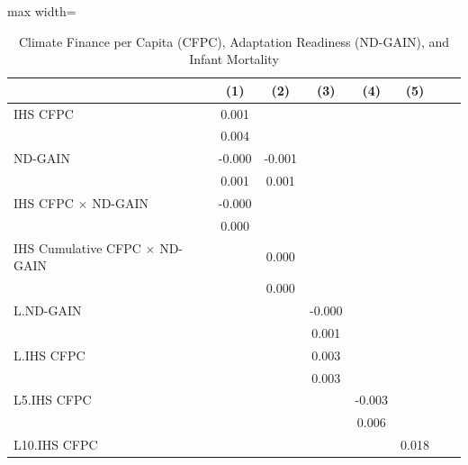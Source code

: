 \begin{table}[htbp]\centering \caption{Climate Finance per Capita (CFPC), Adaptation Readiness (ND-GAIN), and Infant Mortality} \begin{adjustbox}{max width=\textwidth} \begin{tabular}{l*{7}{c}} \toprule
                    &\multicolumn{1}{c}{(1)}   &\multicolumn{1}{c}{(2)}   &\multicolumn{1}{c}{(3)}   &\multicolumn{1}{c}{(4)}   &\multicolumn{1}{c}{(5)}   \\
\midrule
IHS CFPC            &       0.001   &               &               &               &               \\
                    &       0.004   &               &               &               &               \\
ND-GAIN             &      -0.000   &      -0.001   &               &               &               \\
                    &       0.001   &       0.001   &               &               &               \\
IHS CFPC $\times$ ND-GAIN&      -0.000   &               &               &               &               \\
                    &       0.000   &               &               &               &               \\
IHS Cumulative CFPC $\times$ ND-GAIN&               &       0.000   &               &               &               \\
                    &               &       0.000   &               &               &               \\
L.ND-GAIN           &               &               &      -0.000   &               &               \\
                    &               &               &       0.001   &               &               \\
L.IHS CFPC          &               &               &       0.003   &               &               \\
                    &               &               &       0.003   &               &               \\
L5.IHS CFPC         &               &               &               &      -0.003   &               \\
                    &               &               &               &       0.006   &               \\
L10.IHS CFPC        &               &               &               &               &       0.018   \\

\end{tabular}
\end{adjustbox}
\end{table}
